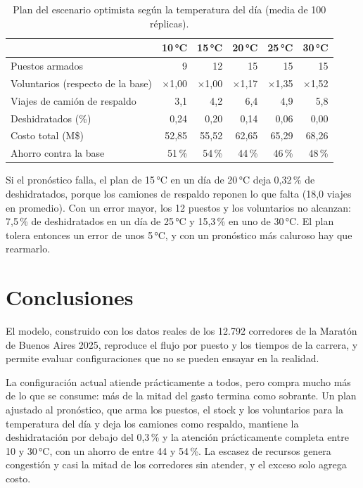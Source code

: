 \documentclass[11pt,a4paper]{article}
\begin{document}
\begin{table}[H]
\centering
\small
\begin{tabular}{lrrrrr}
\toprule
 & \textbf{10\,°C} & \textbf{15\,°C} & \textbf{20\,°C} & \textbf{25\,°C} & \textbf{30\,°C} \\
\midrule
Puestos armados & 9 & 12 & 15 & 15 & 15 \\
Voluntarios (respecto de la base) & $\times$1,00 & $\times$1,00 & $\times$1,17 & $\times$1,35 & $\times$1,52 \\
Viajes de camión de respaldo & 3,1 & 4,2 & 6,4 & 4,9 & 5,8 \\
Deshidratados (\%) & 0,24 & 0,20 & 0,14 & 0,06 & 0,00 \\
Costo total (M\$) & 52,85 & 55,52 & 62,65 & 65,29 & 68,26 \\
Ahorro contra la base & 51\,\% & 54\,\% & 44\,\% & 46\,\% & 48\,\% \\
\bottomrule
\end{tabular}
\caption{Plan del escenario optimista según la temperatura del día (media de 100 réplicas).}
\label{tab:plan-clima}
\end{table}

Si el pronóstico falla, el plan de 15\,°C en un día de 20\,°C deja 0,32\,\% de deshidratados, porque los camiones de respaldo reponen lo que falta (18,0 viajes en promedio). Con un error mayor, los 12 puestos y los voluntarios no alcanzan: 7,5\,\% de deshidratados en un día de 25\,°C y 15,3\,\% en uno de 30\,°C. El plan tolera entonces un error de unos 5\,°C, y con un pronóstico más caluroso hay que rearmarlo.

\section{Conclusiones}

El modelo, construido con los datos reales de los 12.792 corredores de la Maratón de Buenos Aires 2025, reproduce el flujo por puesto y los tiempos de la carrera, y permite evaluar configuraciones que no se pueden ensayar en la realidad.

La configuración actual atiende prácticamente a todos, pero compra mucho más de lo que se consume: más de la mitad del gasto termina como sobrante. Un plan ajustado al pronóstico, que arma los puestos, el stock y los voluntarios para la temperatura del día y deja los camiones como respaldo, mantiene la deshidratación por debajo del 0,3\,\% y la atención prácticamente completa entre 10 y 30\,°C, con un ahorro de entre 44 y 54\,\%. La escasez de recursos genera congestión y casi la mitad de los corredores sin atender, y el exceso solo agrega costo.
\end{document}

